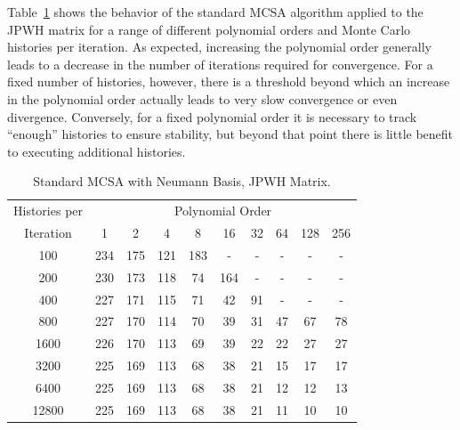 \documentclass[10pt]{article}
\begin{document}
Table~\ref{tab:jpwh_standard_neumann} shows the behavior of
the standard MCSA algorithm applied to the JPWH matrix for a range
of different polynomial orders and Monte Carlo histories per iteration.
As expected, increasing the polynomial order generally leads to a decrease
in the number of iterations required for convergence.
For a fixed number of histories, however, there is a threshold beyond
which an increase in the polynomial order actually leads to very slow
convergence or even divergence.  Conversely, for a fixed polynomial order
it is necessary to track ``enough'' histories to ensure stability, but 
beyond that point there is little benefit to executing additional histories.
\begin{table}
\caption{Standard MCSA with Neumann Basis, JPWH Matrix. 
\label{tab:jpwh_standard_neumann}}
\centering
\begin{tabular}{cccccccccc}
\toprule
Histories per & \multicolumn{9}{c}{Polynomial Order} \\
Iteration & 1 & 2 & 4 & 8 & 16 & 32 & 64 & 128 & 256 \\
\midrule
100 & 234 & 175 & 121 & 183 & - & - & - & - & - \\
200 & 230 & 173 & 118 & 74 & 164 & - & - & - & - \\
400 & 227 & 171 & 115 & 71 & 42 & 91 & - & - & - \\
800 & 227 & 170 & 114 & 70 & 39 & 31 & 47 & 67 & 78 \\
1600 & 226 & 170 & 113 & 69 & 39 & 22 & 22 & 27 & 27 \\
3200 & 225 & 169 & 113 & 68 & 38 & 21 & 15 & 17 & 17 \\
6400 & 225 & 169 & 113 & 68 & 38 & 21 & 12 & 12 & 13 \\
12800 & 225 & 169 & 113 & 68 & 38 & 21 & 11 & 10 & 10 \\
\bottomrule
\end{tabular}
\end{table}
\end{document}
